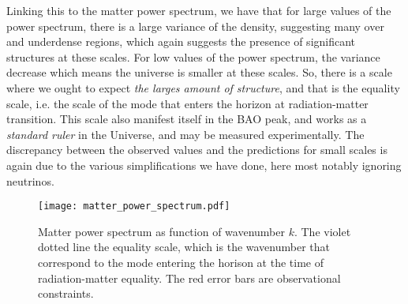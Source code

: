         Linking this to the matter power spectrum, we have that for large values of the power spectrum, there is a large variance of the density, suggesting many over and underdense regions, which again suggests the presence of significant structures at these scales. For low values of the power spectrum, the variance decrease which means the universe is smaller at these scales. So, there is a scale where we ought to expect \textit{the larges amount of structure}, and that is the equality scale, i.e. the scale of the mode that enters the horizon at radiation-matter transition. This scale also manifest itself in the BAO peak, and works as a \textit{standard ruler} in the Universe, and may be measured experimentally. The discrepancy between the observed values and the predictions for small scales is again due to the various simplifications we have done, here most notably ignoring neutrinos.
    \begin{figure}
        \texttt{[image: matter\_power\_spectrum.pdf]}
        \caption{Matter power spectrum as function of wavenumber $k$. The violet dotted line the equality scale, which is the wavenumber that correspond to the mode entering the horison at the time of radiation-matter equality. The red error bars are observational constraints.}
        \label{fig:m4:matter_power_spectrum}
    \end{figure}